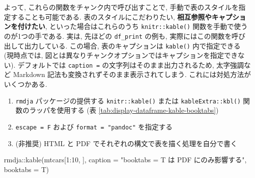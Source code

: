 \documentclass[
  xelatex,ja=standard,jafont=noto]{bxjsbook}
\newenvironment{Shaded}{\begin{snugshade}}{\end{snugshade}}
\newcommand{\AttributeTok}[1]{\textcolor[rgb]{0.77,0.63,0.00}{#1}}
\newcommand{\DecValTok}[1]{\textcolor[rgb]{0.00,0.00,0.81}{#1}}
\newcommand{\FunctionTok}[1]{\textcolor[rgb]{0.00,0.00,0.00}{#1}}
\newcommand{\NormalTok}[1]{#1}
\newcommand{\SpecialCharTok}[1]{\textcolor[rgb]{0.00,0.00,0.00}{#1}}
\newcommand{\StringTok}[1]{\textcolor[rgb]{0.31,0.60,0.02}{#1}}
\providecommand{\tightlist}{%
  \setlength{\itemsep}{0pt}\setlength{\parskip}{0pt}}
\theoremstyle{definition}
\theoremstyle{definition}
\theoremstyle{definition}
\theoremstyle{definition}
\theoremstyle{remark}
\begin{document}
よって, これらの関数をチャンク内で呼び出すことで,
手動で表のスタイルを指定することも可能である.
表のスタイルにこだわりたい, \textbf{相互参照やキャプションを付けたい},
といった場合はこれらのうち \texttt{knitr::kable()}
関数を手動で使うのが1つの手である. 実は, 先ほどの \texttt{df\_print}
の例も, 実際にはこの関数を呼び出して出力している. この場合,
表のキャプションは \texttt{kable()} 内で指定できる (現時点では,
図とは異なりチャンクオプションではキャプションを指定できない).
デフォルトでは \texttt{caption\ =} の文字列はそのまま出力されるため,
太字強調など Markdown 記法も変換されずそのまま表示されてしまう.
これには対処方法がいくつかある.

\begin{enumerate}
\def\labelenumi{\arabic{enumi}.}
\tightlist
\item
  \texttt{rmdja} パッケージの提供する \texttt{knitr::kable()} または
  \texttt{kableExtra::kbl()} 関数のラッパを使用する (表
  \ref{tab:display-dataframe-kable-booktabs})
\item
  \texttt{escape\ =\ F} および \texttt{format\ =\ "pandoc"} を指定する
\item
  (非推奨) HTML と PDF でそれぞれの構文で表を描く処理を自分で書く
\end{enumerate}

\begin{Shaded}
\begin{Highlighting}[numbers=left,,]
\NormalTok{rmdja}\SpecialCharTok{::}\FunctionTok{kable}\NormalTok{(mtcars[}\DecValTok{1}\SpecialCharTok{:}\DecValTok{10}\NormalTok{, ], }\AttributeTok{caption =} \StringTok{"\textasciigrave{}booktabs = T\textasciigrave{} は PDF にのみ影響する"}\NormalTok{, }\AttributeTok{booktabs =}\NormalTok{ T)}
\end{Highlighting}
\end{Shaded}
\end{document}
